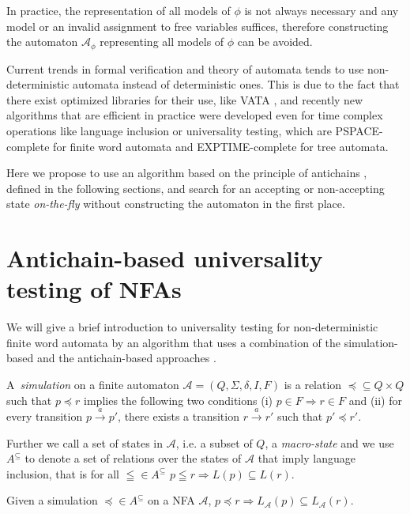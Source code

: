 In practice, the representation of all models of $\phi$ is not always necessary
and any model or an invalid assignment to free variables suffices, therefore
constructing the automaton $\mathcal{A}_{\phi}$ representing all models of
$\phi$ can be avoided.

Current trends in formal verification and theory of automata tends to use
non-deter\-ministic automata instead of deterministic ones. This is due to the
fact that there exist optimized libraries for their use, like VATA
\cite{vata}, and recently new algorithms that are efficient in practice
were developed even for time complex operations like language inclusion or
universality testing, which are PSPACE-complete for finite word automata and
EXPTIME-complete for tree automata.

Here we propose to use an algorithm based on the principle of antichains
\cite{tacas}, defined in the following sections, and search for an accepting
or non-accepting state \emph{on-the-fly} without constructing the automaton in
the first place.

\section{Antichain-based universality testing of NFAs}

We will give a brief introduction to universality testing for non-deterministic
finite word automata by an algorithm that uses a combination
of the simulation-based and the antichain-based approaches \cite{tacas}.

\begin{defz}
A~\emph{simulation} on a finite automaton $\mathcal{A} = (Q, \Sigma, \delta, I,
F)$ is a relation $\preceq \subseteq Q \times Q$ such that $p \preceq r$ implies
the following two conditions (i) $p \in F \Rightarrow r \in F$ and (ii) for
every transition $p \overset{a}{\longrightarrow} p'$, there exists a transition $r
\overset{a}{\longrightarrow} r'$ such that $p' \preceq r'$.
\end{defz}

Further we call a set of states in $\mathcal{A}$, i.e. a subset of $Q$, a
\emph{macro-state} and we use $A^{\subseteq}$ to denote a set of relations over
the states of $\mathcal{A}$ that imply language inclusion, that is for all
$\leqq \in A^{\subseteq}$ $p \leqq r \Rightarrow L(p) \subseteq L(r)$.

\begin{lemma}
Given a simulation $\preceq \in A^{\subseteq}$ on a NFA $\mathcal{A}$, $p
\preceq r \Rightarrow L_\mathcal{A}(p) \subseteq L_\mathcal{A}(r)$.
\end{lemma}

